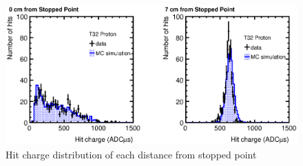 \begin{figure}[htbp]
  \centering
  \includegraphics[width=1.0\hsize,clip]{fig/Proton_2.eps}
  \caption{Hit charge distribution of each distance from stopped point}
  \label{fig:ADC_distribution}
\end{figure}



